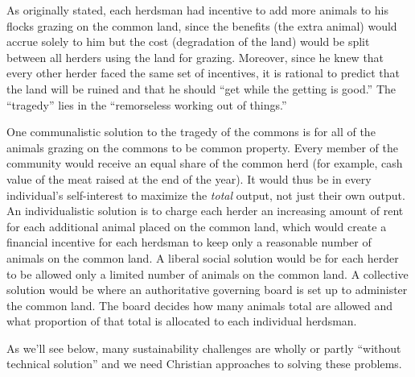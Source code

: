 \documentclass[12pt]{article}
\begin{document}
As originally stated, each herdsman had incentive to add more animals to his flocks grazing on the common land, since
the benefits (the extra animal) would accrue solely to him but the cost (degradation of the land) would be split between
all herders using the land for grazing. Moreover, since he knew that every other herder faced the same set of
incentives, it is rational to predict that the land will be ruined and that he should ``get while the getting is good.''
The ``tragedy'' lies in the ``remorseless working out of things.''

One communalistic solution to the tragedy of the commons is for all of the animals grazing on the commons to be common
property. Every member of the community would receive an equal share of the common herd (for example, cash value of the
meat raised at the end of the year). It would thus be in every individual's self-interest to maximize the \emph{total}
output, not just their own output. An individualistic solution is to charge each herder an increasing amount of rent for
each additional animal placed on the common land, which would create a financial incentive for each herdsman to keep
only a reasonable number of animals on the common land. A liberal social solution would be for each herder to be allowed
only a limited number of animals on the common land. A collective solution would be where an authoritative governing
board is set up to administer the common land. The board decides how many animals total are allowed and what proportion
of that total is allocated to each individual herdsman.

As we'll see below, many sustainability challenges are wholly or partly ``without technical solution'' and we need
Christian approaches to solving these problems.
\end{document}
